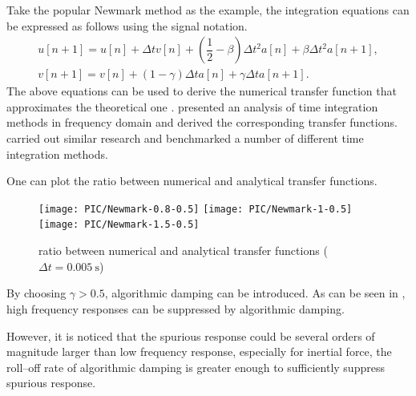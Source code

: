 Take the popular Newmark method as the example, the integration equations can be expressed as follows using the signal notation.
\begin{gather}
u[n+1]=u[n]+\Delta{}tv[n]+\left(\dfrac{1}{2}-\beta\right)\Delta{}t^2a[n]+\beta\Delta{}t^2a[n+1],\\
v[n+1]=v[n]+\left(1-\gamma\right)\Delta{}ta[n]+\gamma\Delta{}ta[n+1].
\end{gather}
The above equations can be used to derive the numerical transfer function that approximates the theoretical one . \citet{Preumont1982} presented an analysis of time integration methods in frequency domain and derived the corresponding transfer functions. \citet{AriasTrujillo2012} carried out similar research and benchmarked a number of different time integration methods.

One can plot the ratio between numerical and analytical transfer functions.
\begin{figure}[htb!]
\centering
\texttt{[image: PIC/Newmark-0.8-0.5]}
\texttt{[image: PIC/Newmark-1-0.5]}
\texttt{[image: PIC/Newmark-1.5-0.5]}
\caption{ratio between numerical and analytical transfer functions ($\Delta{}t=\SI{0.005}{\second}$)}\label{fig:newmark_alg_damping}
\end{figure}
By choosing $\gamma>\num{0.5}$, algorithmic damping can be introduced. As can be seen in , high frequency responses can be suppressed by algorithmic damping.

However, it is noticed that the spurious response could be several orders of magnitude larger than low frequency response, especially for inertial force, the roll--off rate of algorithmic damping is greater enough to sufficiently suppress spurious response.